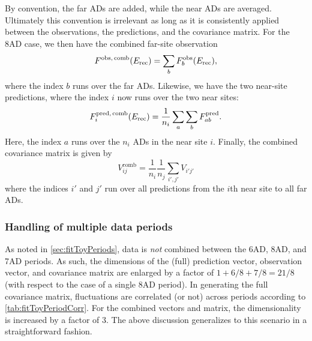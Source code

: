 \documentclass[../thesis.tex]{subfiles}
\begin{document}
By convention, the far ADs are added, while the near ADs are averaged. Ultimately this convention is irrelevant as long as it is consistently applied between the observations, the predictions, and the covariance matrix. For the 8AD case, we then have the combined far-site observation
\begin{equation}
  F^{\mathrm{obs},\,\mathrm{comb}}(E_\mathrm{rec}) = \sum_b F^{\mathrm{obs}}_b(E_\mathrm{rec}),
\end{equation}
where the index $b$ runs over the far ADs. Likewise, we have the two near-site predictions, where the index $i$ now runs over the two near sites:
\begin{equation}
  F^{\mathrm{pred},\,\mathrm{comb}}_i (E_\mathrm{rec}) = \frac{1}{n_i} \sum_a \sum_b F^{\mathrm{pred}}_{ab}.
\end{equation}
Here, the index $a$ runs over the $n_i$ ADs in the near site $i$. Finally, the combined covariance matrix is given by
\begin{equation}
  V^{\mathrm{comb}}_{ij} = \frac{1}{n_i} \frac{1}{n_j} \sum_{i',j'} V_{i'j'}
\end{equation}
where the indices $i'$ and $j'$ run over all predictions from the $i$th near site to all far ADs.

\subsubsection{Handling of multiple data periods}

As noted in \autoref{sec:fitToyPeriods}, data is \emph{not} combined between the 6AD, 8AD, and 7AD periods. As such, the dimensions of the (full) prediction vector, observation vector, and covariance matrix are enlarged by a factor of $1 + 6/8 + 7/8 = 21/8$ (with respect to the case of a single 8AD period). In generating the full covariance matrix, fluctuations are correlated (or not) across periods according to \autoref{tab:fitToyPeriodCorr}. For the combined vectors and matrix, the dimensionality is increased by a factor of 3. The above discussion generalizes to this scenario in a straightforward fashion.

\begin{comment}
What do we ultimately get? Check P14A technote. 2 (near sites) x 3 (periods) = 4 predictions, over 37 energy bins. Size of covariance matrix is thus 37 x 2 x 3.
\end{comment}

\begin{comment}
Data is summed across all ADs in each near site.
\end{comment}
\end{document}
